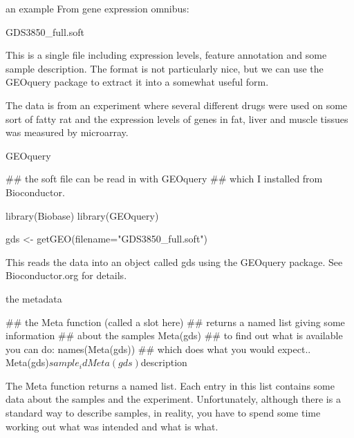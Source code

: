 \documentclass[pdf]{beamer}
\begin{document}
\begin{frame}{an example}
  From gene expression omnibus:
  
  GDS3850\_full.soft

  This is a single file including expression levels, feature annotation
  and some sample description. The format is not particularly nice, but
  we can use the GEOquery package to extract it into a somewhat useful form.

  The data is from an experiment where several different drugs were used
  on some sort of fatty rat and the expression levels of genes in fat,
  liver and muscle tissues was measured by microarray.

\end{frame}

\begin{frame}[fragile]{GEOquery}
\begin{rcode}
## the soft file can be read in with GEOquery
## which I installed from Bioconductor.

library(Biobase)
library(GEOquery)

gds <- getGEO(filename="GDS3850_full.soft")
\end{rcode}

This reads the data into an object called gds using the GEOquery package.
See Bioconductor.org for details.
\end{frame}

\begin{frame}[fragile]{the metadata}
  \begin{rcode}
    ## the Meta function (called a slot here)
    ## returns a named list giving some information
    ## about the samples
    Meta(gds)
    ## to find out what is available you can do:
    names(Meta(gds))
    ## which does what you would expect..
    Meta(gds)$sample_id
    Meta(gds)$description
  \end{rcode}

  The Meta function returns a named list. Each entry in this list contains
  some data about the samples and the experiment. Unfortunately, although
  there is a standard way to describe samples, in reality, you have to spend
  some time working out what was intended and what is what.
\end{frame}
\end{document}
